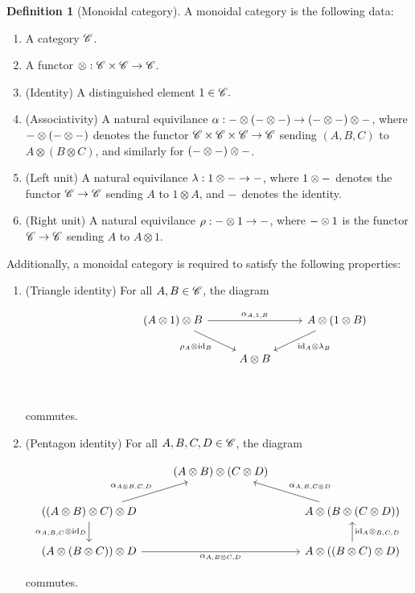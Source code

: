 \documentclass{article}
\theoremstyle{definition}
\newtheorem*{definition}{Definition}
\numberwithin{figure}{section}
\begin{document}
\begin{definition}[Monoidal category] A monoidal category is the following data:

\begin{enumerate}
\item A category $\mathscr{C}$.
\item A functor $\otimes: \mathscr{C} \times \mathscr{C} \to \mathscr{C}$.
\item (Identity) A distinguished element $1\in \mathscr{C}.$
\item (Associativity) A natural equivilance $\alpha: \--\otimes (\-- \otimes \--) \to (\--\otimes \--)\otimes \--$, where $\-- \otimes (\--\otimes \--)$ denotes the functor $\mathscr{C}\times \mathscr{C}\times \mathscr{C}\to\mathscr{C}$ sending $(A,B,C)$ to $A\otimes (B\otimes C)$, and similarly for $(\-- \otimes \-- )\otimes\--$.
\item (Left unit) A  natural equivilance $\lambda: 1\otimes \-- \to \--$, where $1\otimes \--$ denotes the functor $\mathscr{C}\to \mathscr{C}$ sending $A$ to $1\otimes A$, and $\--$ denotes the identity.
\item (Right unit) A natural equivilance $\rho: \--\otimes 1 \to \--$, where $\--\otimes 1$ is the functor $\mathscr{C}\to \mathscr{C}$ sending $A$ to $A\otimes 1$.
\end{enumerate}

Additionally, a monoidal category is required to satisfy the following properties:

\begin{enumerate}
\item (Triangle identity) For all $A,B\in \mathscr{C}$, the diagram

\[\begin{tikzcd}
	{} & {} & {\left(A\otimes 1\right)\otimes B} & {} & {A\otimes (1\otimes B)} \\
	&& {} & {A\otimes B} \\
	&&&& {}
	\arrow["{\alpha_{A,1,B}}", from=1-3, to=1-5]
	\arrow["{\rho_A\otimes \text{id}_B}"', from=1-3, to=2-4]
	\arrow["{\text{id}_A\otimes \lambda_B}", from=1-5, to=2-4]
\end{tikzcd}\]

commutes.

\item (Pentagon identity) For all $A,B,C,D\in \mathscr{C}$, the diagram

\[\begin{tikzcd}
	& {(A\otimes B)\otimes(C\otimes D)} \\
	{((A\otimes B)\otimes C)\otimes D} && {A\otimes (B\otimes (C\otimes D))} \\
	{(A\otimes (B\otimes C))\otimes D} && {A\otimes((B\otimes C)\otimes D)}
	\arrow["{\alpha_{A\otimes B, C,D}}", from=2-1, to=1-2]
	\arrow["{\alpha_{A,B,{C\otimes D}}}"', from=2-3, to=1-2]
	\arrow["{\alpha_{A,B,C}\otimes \text{id}_D}"', from=2-1, to=3-1]
	\arrow["{\text{id}_A\otimes_{B,C,D}}"', from=3-3, to=2-3]
	\arrow["{\alpha_{A,B\otimes C,D}}"', from=3-1, to=3-3]
\end{tikzcd}\]

commutes.
\end{enumerate}

\raggedleft\qedsymbol{}
\end{definition}
\end{document}
